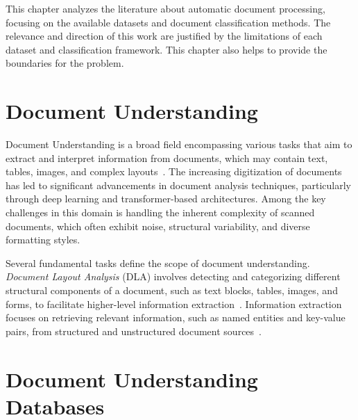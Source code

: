 This chapter analyzes the literature about automatic document processing, focusing on the available datasets and document classification methods. The relevance and direction of this work are justified by the limitations of each dataset and classification framework. This chapter also helps to provide the boundaries for the problem.

\section{Document Understanding}

Document Understanding is a broad field encompassing various tasks that aim to extract and interpret information from documents, which may contain text, tables, images, and complex layouts~\cite{abdallah_survey_2024}. The increasing digitization of documents has led to significant advancements in document analysis techniques, particularly through deep learning and transformer-based architectures. Among the key challenges in this domain is handling the inherent complexity of scanned documents, which often exhibit noise, structural variability, and diverse formatting styles.

Several fundamental tasks define the scope of document understanding. \textit{Document Layout Analysis} (DLA) involves detecting and categorizing different structural components of a document, such as text blocks, tables, images, and forms, to facilitate higher-level information extraction~\cite{zhong_publaynet_2019}. Information extraction focuses on retrieving relevant information, such as named entities and key-value pairs, from structured and unstructured document sources~\cite{abdallah_survey_2024}. 


\section{Document Understanding Databases}

